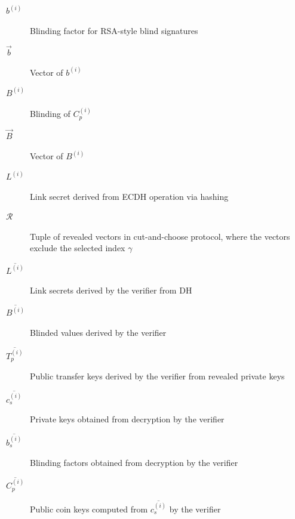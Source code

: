 \documentclass[sigconf, authordraft]{acmart}
\begin{document}
\begin{description}
  \item[$b^{(i)}$]{Blinding factor for RSA-style blind signatures}
  \item[$\vec{b}$]{Vector of $b^{(i)}$}
  \item[$B^{(i)}$]{Blinding of $C_p^{(i)}$}
  \item[$\vec{B}$]{Vector of $B^{(i)}$}
  \item[$L^{(i)}$]{Link secret derived from ECDH operation via hashing}
  \item[$\mathcal{R}$]{Tuple of revealed vectors in cut-and-choose protocol,
    where the vectors exclude the selected index $\gamma$}
  \item[$\overline{L^{(i)}}$]{Link secrets derived by the verifier from DH}
  \item[$\overline{B^{(i)}}$]{Blinded values derived by the verifier}
  \item[$\overline{T_p^{(i)}}$]{Public transfer keys derived by the verifier from revealed private keys}
  \item[$\overline{c_s^{(i)}}$]{Private keys obtained from decryption by the verifier}
  \item[$\overline{b_s^{(i)}}$]{Blinding factors obtained from decryption by the verifier}
  \item[$\overline{C^{(i)}_p}$]{Public coin keys computed from $\overline{c_s^{(i)}}$ by the verifier}
\end{description}
\end{document}

